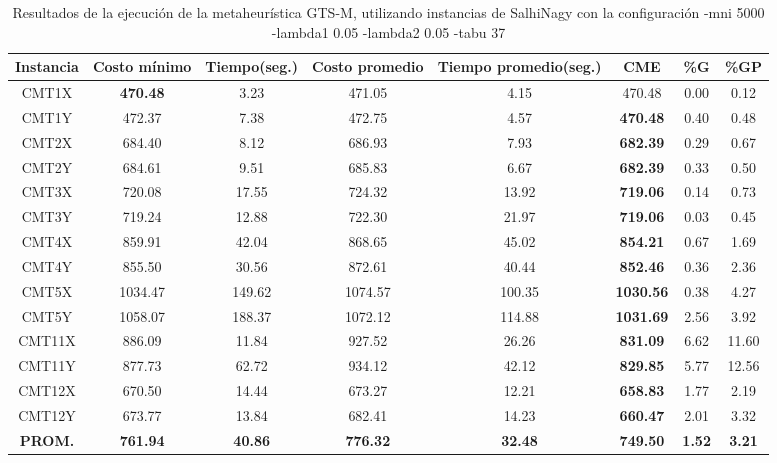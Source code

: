 \begin{table}[h]
\caption{Resultados de la ejecución de la metaheurística GTS-M, utilizando instancias de SalhiNagy con la configuración -mni 5000 -lambda1 0.05 -lambda2 0.05 -tabu 37}
\centering
\small
\begin{tabular}{c c c c c c c c}
\hline\hline
Instancia & Costo mínimo & Tiempo(seg.) & Costo promedio & Tiempo promedio(seg.) & CME & \%G & \%GP \\ [0.5ex]
\hline
CMT1X & \bf{470.48} & 3.23 & 
471.05 & 4.15 & 470.48 & 0.00
 & 0.12\\CMT1Y & 472.37 & 7.38 & 
472.75 & 4.57 & \bf{470.48} & 
0.40 & 0.48\\CMT2X & 684.40 & 8.12 & 
686.93 & 7.93 & \bf{682.39} & 
0.29 & 0.67\\CMT2Y & 684.61 & 9.51 & 
685.83 & 6.67 & \bf{682.39} & 
0.33 & 0.50\\CMT3X & 720.08 & 17.55 & 
724.32 & 13.92 & \bf{719.06} & 
0.14 & 0.73\\CMT3Y & 719.24 & 12.88 & 
722.30 & 21.97 & \bf{719.06} & 
0.03 & 0.45\\CMT4X & 859.91 & 42.04 & 
868.65 & 45.02 & \bf{854.21} & 
0.67 & 1.69\\CMT4Y & 855.50 & 30.56 & 
872.61 & 40.44 & \bf{852.46} & 
0.36 & 2.36\\CMT5X & 1034.47 & 149.62 & 
1074.57 & 100.35 & \bf{1030.56} & 
0.38 & 4.27\\CMT5Y & 1058.07 & 188.37 & 
1072.12 & 114.88 & \bf{1031.69} & 
2.56 & 3.92\\CMT11X & 886.09 & 11.84 & 
927.52 & 26.26 & \bf{831.09} & 
6.62 & 11.60\\CMT11Y & 877.73 & 62.72 & 
934.12 & 42.12 & \bf{829.85} & 
5.77 & 12.56\\CMT12X & 670.50 & 14.44 & 
673.27 & 12.21 & \bf{658.83} & 
1.77 & 2.19\\CMT12Y & 673.77 & 13.84 & 
682.41 & 14.23 & \bf{660.47} & 
2.01 & 3.32\\\bf{PROM.} & 
\bf{761.94} & \bf{40.86} & \bf{776.32} & \bf{32.48} & \bf{749.50} & \bf{1.52} & \bf{3.21}\\[1ex]\hline
\end{tabular}
\label{table:nonlin}
\end{table}

